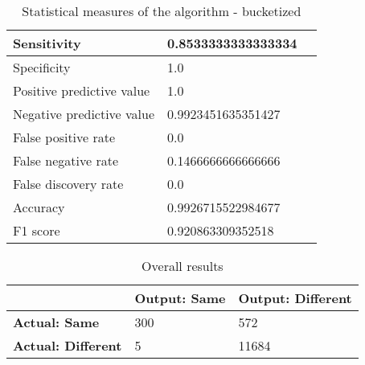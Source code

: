 \begin{table}[H]
    \centering
	\begin{spacing}{1.5}    
    \begin{tabular}{|l|l|l|}
        \hline
        Sensitivity                 & 0.8533333333333334 \\
        \hline
        Specificity                 & 1.0 \\
        \hline
        Positive predictive value   & 1.0 \\
        \hline
        Negative predictive value   & 0.9923451635351427 \\
        \hline
        False positive rate         & 0.0 \\
        \hline
        False negative rate         & 0.1466666666666666 \\
        \hline
        False discovery rate        & 0.0 \\
        \hline
        Accuracy                    & 0.9926715522984677 \\
        \hline
        F1 score                    & 0.920863309352518 \\
        \hline
    \end{tabular}
    \end{spacing}
    \caption{Statistical measures of the algorithm - bucketized}
\end{table}


\begin{table}[H]
    \centering
    \begin{spacing}{1.5}
    \begin{tabular}{|l|l|l|}
        \hline
        \cellcolor{gray} & \textbf{Output: Same} & \textbf{Output: Different} \\ [0.5ex]
        \hline\hline
        \textbf{Actual: Same} & 300 & 572 \\ [0.5ex]
        \hline
        \textbf{Actual: Different} & 5 & 11684 \\ [0.5ex]
        \hline
    \end{tabular}
    \end{spacing}
    \caption{Overall results}
\end{table}
        
